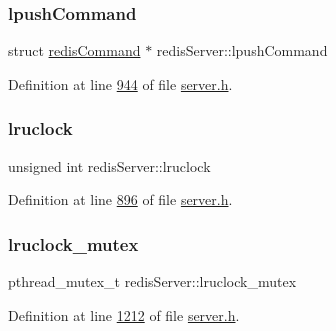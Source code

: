 \mbox{\label{structredisServer_a9a786a2007c1721cefe374e5a252bfeb}} 
\subsubsection{\texorpdfstring{lpush\+Command}{lpushCommand}}
{\footnotesize\ttfamily struct \hyperlink{structredisCommand}{redis\+Command} $\ast$ redis\+Server\+::lpush\+Command}



Definition at line \hyperlink{server_8h_source_l00944}{944} of file \hyperlink{server_8h_source}{server.\+h}.

\mbox{\label{structredisServer_abb834d206976963ee0ee6067fb1eb9f2}} 
\subsubsection{\texorpdfstring{lruclock}{lruclock}}
{\footnotesize\ttfamily unsigned int redis\+Server\+::lruclock}



Definition at line \hyperlink{server_8h_source_l00896}{896} of file \hyperlink{server_8h_source}{server.\+h}.

\mbox{\label{structredisServer_a1ce4627ac237fda78fc784a99921a971}} 
\subsubsection{\texorpdfstring{lruclock\+\_\+mutex}{lruclock\_mutex}}
{\footnotesize\ttfamily pthread\+\_\+mutex\+\_\+t redis\+Server\+::lruclock\+\_\+mutex}



Definition at line \hyperlink{server_8h_source_l01212}{1212} of file \hyperlink{server_8h_source}{server.\+h}.

\mbox{\label{structredisServer_aaa8ed005d0ee475895f1c1e4f2d6df6f}} 
